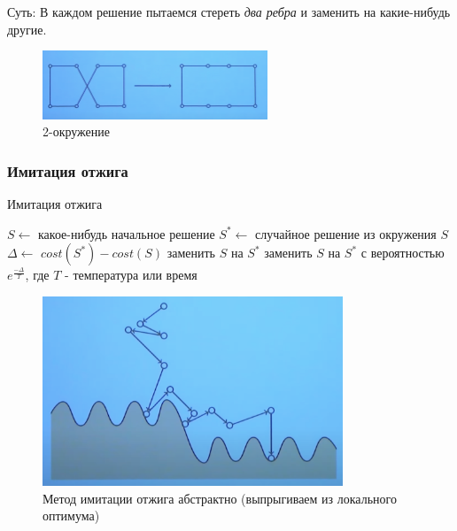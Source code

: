             Суть: В каждом решение пытаемся стереть \textit{два ребра} и заменить на какие-нибудь другие.

            \begin{figure}[H]
                \centering
                \includegraphics[width=0.6\textwidth]{images/chapter3/2-opt.png}
                \caption{2-окружение}
                \label{fig:images/chapter3/2-opt.png}
            \end{figure}
        
        \subsubsection{Имитация отжига}
            \begin{algorithm}
            \caption{Имитация отжига}
            \begin{algorithmic}
                \STATE $S \longleftarrow$ какое-нибудь начальное решение
                \LOOP
                    \STATE $S^* \longleftarrow$ случайное решение из окружения $S$
                    \STATE $\Delta \longleftarrow$ $cost(S^*) - cost(S)$
                        \STATE заменить $S$ на $S^*$
                    \ELSE
                        \STATE заменить $S$ на $S^*$ с вероятностью $e^{\frac{-\Delta}{T}}$, где $T$ - температура или время
                    \ENDIF
                \ENDLOOP
            \end{algorithmic}
            \end{algorithm}

            \begin{figure}[H]
                \centering
                \includegraphics[width=0.8\textwidth]{images/chapter3/simulated-annealing-abstract.png}
                \caption{Метод имитации отжига абстрактно (выпрыгиваем из локального оптимума)}
                \label{fig:images/chapter3/simulated-annealing-abstract.png}
            \end{figure}
        

